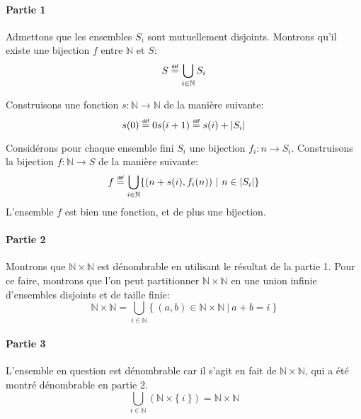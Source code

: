 \documentclass[12pt,french,a4paper]{article}
\newcommand\eqdef{\mathrel{\overset{\makebox[0pt]{\mbox{\normalfont\tiny\sffamily déf}}}{=}}}
\begin{document}
\begin{question}
\paragraph{Partie 1}
Admettons que les ensembles $S_i$ sont mutuellement disjoints.
Montrons qu'il existe une bijection $f$ entre $\mathbb{N}$ et $S$:
\[
S \eqdef \bigcup_{i \in \mathbb{N}} S_i
\]

Construisons une fonction $s : \mathbb{N} \to \mathbb{N}$ de la manière suivante:
\[
s(0) \eqdef 0
s(i + 1) \eqdef s(i) + |S_i|
\]

Considérons pour chaque ensemble fini $S_i$ une bijection $f_i : n \to S_i$.
Construisons la bijection $f : \mathbb{N} \to S$ de la manière suivante:
\[
f \eqdef \bigcup_{i \in \mathbb{N}} \{ (n + s(i), f_i(n))\ |\ n \in |S_i| \}
\]
L'ensemble $f$ est bien une fonction, et de plus une bijection.

\paragraph{Partie 2}
Montrons que $\mathbb{N} \times \mathbb{N}$ est dénombrable en utilisant le résultat de la partie 1.
Pour ce faire, montrons que l'on peut partitionner $\mathbb{N} \times \mathbb{N}$ en une union infinie d'ensembles disjoints et de taille finie:
\[
\mathbb{N} \times \mathbb{N} = \bigcup_{i \in \mathbb{N}} \{\ (a, b) \in \mathbb{N} \times \mathbb{N}\ |\ a + b = i\ \}
\]

\paragraph{Partie 3}
L'ensemble en question est dénombrable car il s'agit en fait de $\mathbb{N} \times \mathbb{N}$, qui a été montré dénombrable en partie 2.
\[
\bigcup_{i \in \mathbb{N}} (\mathbb{N} \times \{\ i\ \}) = \mathbb{N} \times \mathbb{N}
\]

\end{question}

\newpage
\end{document}
